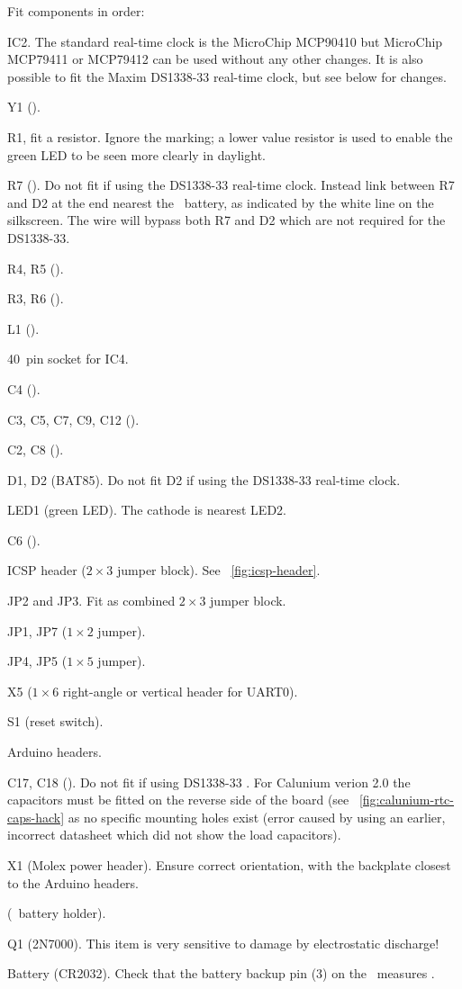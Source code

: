 Fit components in order:
\begin{buildorder}
\item IC2. The standard real-time clock is the MicroChip MCP90410 but
  MicroChip MCP79411 or MCP79412 can be used without any other
  changes.
  It is also possible to fit the Maxim DS1338-33 real-time clock,
  but see below for changes.
\item Y1 ().
\item R1, fit a  resistor. Ignore the  marking; a
  lower value resistor is used to enable the green LED to be seen
  more clearly in daylight.
\item R7 (). Do not fit if using the DS1338-33 real-time
  clock. Instead link between R7 and D2 at the end nearest the \rtc\
  battery, as indicated by the white line on the silkscreen. The wire
  will bypass both R7 and D2 which are not required for the DS1338-33.
\item R4, R5 (\kohm{4.7}).
\item R3, R6 ().
\item L1 ().
\item 40~pin socket for IC4.
\item C4 ().
\item C3, C5, C7, C9, C12 ().
\item C2, C8 ().
\item D1, D2 (BAT85). Do not fit D2 if using the DS1338-33 real-time clock.
\item LED1 (green LED). The cathode is nearest LED2.
\item C6 ().
\item ICSP header ($2 \times 3$ jumper block). See
  \figurename~\ref{fig:icsp-header}.
\item JP2 and JP3. Fit as combined $2 \times 3$ jumper block.
\item JP1, JP7 ($1 \times 2$ jumper).
\item JP4, JP5 ($1 \times 5$ jumper).
\item X5 ($1 \times 6$ right-angle or vertical header for UART0).
\item S1 (reset switch).
\item Arduino headers. 
\item C17, C18 (). Do not fit if using DS1338-33 \rtc. For
  Calunium verion 2.0 the capacitors must be fitted on the reverse
  side of the board (see \figurename~\ref{fig:calunium-rtc-caps-hack}
  as no specific mounting holes exist (error caused by using an
  earlier, incorrect datasheet which did not show the load
  capacitors).
\item X1 (Molex power header). Ensure correct orientation, with the
  backplate closest to the Arduino headers.
\item {} (\rtc\ battery holder).
\item Q1 (2N7000). This item is very sensitive to damage by
  electrostatic discharge!
\item Battery (CR2032). Check that the battery backup pin (3) on the
  \rtc\ measures \volt{3.0}.
\item {}
\end{buildorder}
